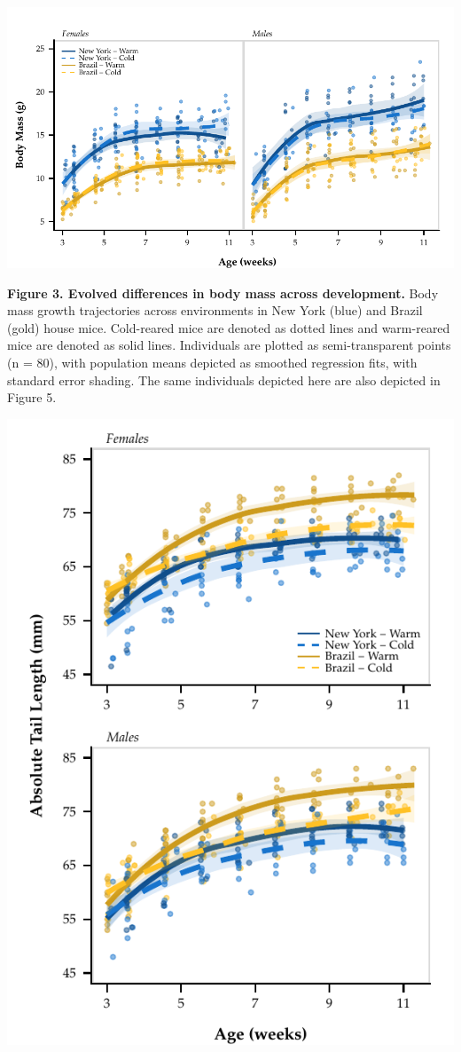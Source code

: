 \documentclass[]{article}
\begin{document}
\newpage

\includegraphics{../results/figures/Weekly_BW.pdf}

\textbf{Figure 3. Evolved differences in body mass across development.}
Body mass growth trajectories across environments in New York (blue) and
Brazil (gold) house mice. Cold-reared mice are denoted as dotted lines
and warm-reared mice are denoted as solid lines. Individuals are plotted
as semi-transparent points (n = 80), with population means depicted as
smoothed regression fits, with standard error shading. The same
individuals depicted here are also depicted in Figure 5.

\newpage

\includegraphics{../results/figures/Weekly_Tails.pdf}
\end{document}
